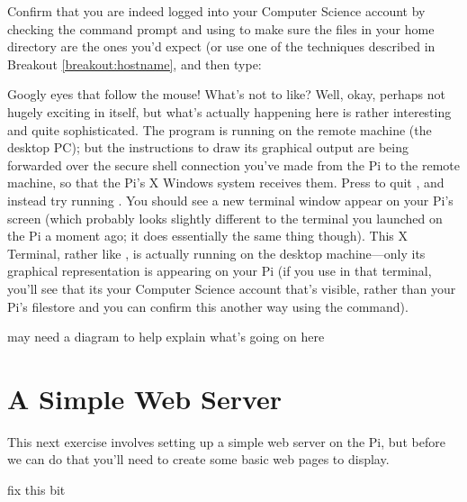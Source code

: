 Confirm that you are indeed logged into your Computer Science account by checking the command prompt and using  to make sure the files in your home directory are the ones you'd expect (or use one of the techniques described in Breakout \ref{breakout:hostname}, and then type:


Googly eyes that follow the mouse! What's not to like? Well, okay, perhaps not hugely exciting in itself, but what's actually happening here is rather interesting and quite sophisticated. The  program is running on the remote machine (the desktop PC); but the instructions to draw its graphical output are being forwarded over the secure shell connection you've made from the Pi to the remote machine, so that the Pi's X Windows system receives them. Press  to quit , and instead try running . You should see a new terminal window appear on your Pi's screen (which probably looks slightly different to the terminal you launched on the Pi a moment ago; it does essentially the same thing though). This X Terminal, rather like , is actually running on the desktop machine---only its graphical representation is appearing on your Pi (if you use  in that terminal, you'll see that its your Computer Science account that's visible, rather than your Pi's filestore and you can confirm this another way using the  command). 


\begin{note}
may need a diagram to help explain what's going on here
\end{note}

\section{A Simple Web Server}

This next exercise involves setting up a simple web server on the Pi, but before we can do that you'll need to create some basic web pages to display. 

\begin{note}
fix this bit
\end{note}

